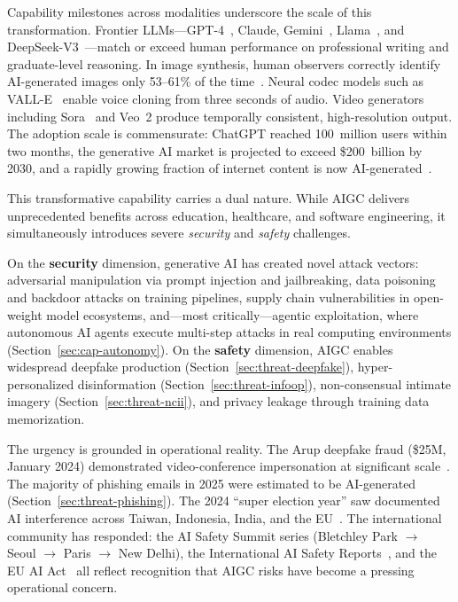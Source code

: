 Capability milestones across modalities underscore the scale of this transformation. Frontier LLMs---GPT-4~\cite{gpt4}, Claude, Gemini~\cite{gemini2024}, Llama~\cite{llama3}, and DeepSeek-V3~\cite{deepseekv3}---match or exceed human performance on professional writing and graduate-level reasoning. In image synthesis, human observers correctly identify AI-generated images only 53--61\% of the time~\cite{microsoft2025human}. Neural codec models such as VALL-E~\cite{wang2023valle} enable voice cloning from three seconds of audio. Video generators including Sora~\cite{brooks2024sora} and Veo~2 produce temporally consistent, high-resolution output. The adoption scale is commensurate: ChatGPT reached 100~million users within two months, the generative AI market is projected to exceed \$200~billion by 2030, and a rapidly growing fraction of internet content is now AI-generated~\cite{graphite2025aicontent}.


This transformative capability carries a dual nature. While AIGC delivers unprecedented benefits across education, healthcare, and software engineering, it simultaneously introduces severe \emph{security} and \emph{safety} challenges.

On the \textbf{security} dimension, generative AI has created novel attack vectors: adversarial manipulation via prompt injection and jailbreaking, data poisoning and backdoor attacks on training pipelines, supply chain vulnerabilities in open-weight model ecosystems, and---most critically---agentic exploitation, where autonomous AI agents execute multi-step attacks in real computing environments (Section~\ref{sec:cap-autonomy}). On the \textbf{safety} dimension, AIGC enables widespread deepfake production (Section~\ref{sec:threat-deepfake}), hyper-personalized disinformation (Section~\ref{sec:threat-infoop}), non-consensual intimate imagery (Section~\ref{sec:threat-ncii}), and privacy leakage through training data memorization.

The urgency is grounded in operational reality. The Arup deepfake fraud (\$25M, January 2024) demonstrated video-conference impersonation at significant scale~\cite{brightside2025phishing}. The majority of phishing emails in 2025 were estimated to be AI-generated (Section~\ref{sec:threat-phishing}). The 2024 ``super election year'' saw documented AI interference across Taiwan, Indonesia, India, and the EU~\cite{restofworld2024tracker}. The international community has responded: the AI Safety Summit series (Bletchley Park $\to$ Seoul $\to$ Paris $\to$ New Delhi), the International AI Safety Reports~\cite{aisafetyreport2025,aisafetyreport2026}, and the EU AI Act~\cite{euaiact2024} all reflect recognition that AIGC risks have become a pressing operational concern.

